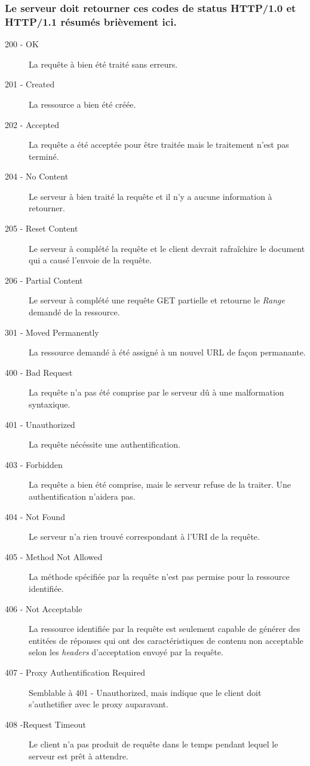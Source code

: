 \documentclass{scrreprt}
\begin{document}
\subsubsection{Le serveur doit retourner ces codes de status HTTP/1.0 et HTTP/1.1 résumés brièvement ici.}
 \begin{description}
 \item [200 - OK] La requête à bien été traité sans erreurs.
 \item [201 - Created] La ressource a bien été créée.
 \item [202 - Accepted] La requête a été acceptée pour être traitée mais le traitement n'est pas terminé.
 \item [204 - No Content] Le serveur à bien traité la requête et il n'y a aucune information à retourner.
 \item [205 - Reset Content] Le serveur à complété la requête et le client devrait rafraîchire le document qui a causé l'envoie de la requête.
 \item [206 - Partial Content] Le serveur à complété une requête GET partielle et retourne le \textit{Range} demandé de la ressource.
 \item [301 - Moved Permanently] La ressource demandé à été assigné à un nouvel URL de façon permanante.
 \item [400 - Bad Request] La requête n'a pas été comprise par le serveur dû à une malformation syntaxique. 
 \item [401 - Unauthorized] La requête nécéssite une authentification.
 \item [403 - Forbidden] La requête a bien été comprise, mais le serveur refuse de la traiter. Une authentification n'aidera pas.
 \item [404 - Not Found] Le serveur n'a rien trouvé correspondant à l'URI de la requête.
 \item [405 - Method Not Allowed] La méthode spécifiée par la requête n'est pas permise pour la ressource identifiée.
 \item [406 - Not Acceptable] La ressource identifiée par la requête est seulement capable de générer des entitées de réponses qui ont des caractéristiques de contenu non acceptable selon les \textit{headers} d'acceptation envoyé par la requête.
 \item [407 - Proxy Authentification Required] Semblable à 401 - Unauthorized, mais indique que le client doit s'authetifier avec le proxy auparavant.
 \item [408 -Request Timeout] Le client n'a pas produit de requête dans le temps pendant lequel le serveur est prêt à attendre.

\end{description}
\end{document}
